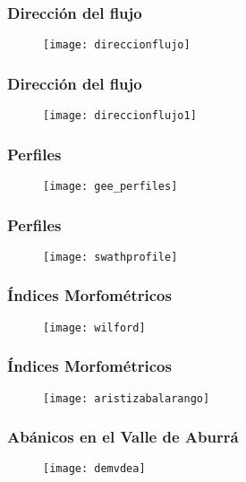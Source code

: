 \documentclass{beamer}
\begin{document}
\begin{frame}
\frametitle{Dirección del flujo}
 \begin{figure}
    \centering
    \texttt{[image: direccionflujo]}
  \end{figure}
\end{frame}
\begin{frame}
\frametitle{Dirección del flujo}
 \begin{figure}
    \centering
    \texttt{[image: direccionflujo1]}
  \end{figure}
\end{frame}
\begin{frame}
\frametitle{Perfiles}
 \begin{figure}
    \centering
    \texttt{[image: gee\_perfiles]}
  \end{figure}
\end{frame}
\begin{frame}
\frametitle{Perfiles}
 \begin{figure}
    \centering
    \texttt{[image: swathprofile]}
  \end{figure}
\end{frame}
\begin{frame}
\frametitle{Índices Morfométricos}
 \begin{figure}
    \centering
    \texttt{[image: wilford]}
  \end{figure}
\end{frame}
\begin{frame}
\frametitle{Índices Morfométricos}
 \begin{figure}
    \centering
    \texttt{[image: aristizabalarango]}
  \end{figure}
\end{frame}
\begin{frame}
\frametitle{Abánicos en el Valle de Aburrá}
 \begin{figure}
    \centering
    \texttt{[image: demvdea]}
  \end{figure}
\end{frame}
\end{document}

